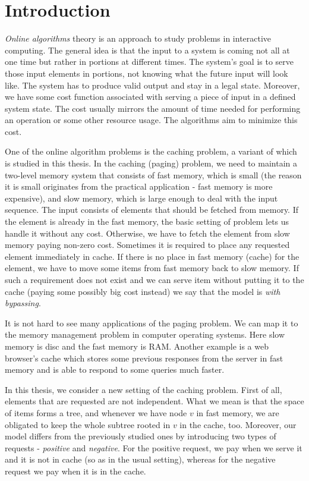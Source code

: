 \section{Introduction}
\textit{Online algorithms} theory is an approach to study problems in 
interactive computing. The general idea is that the input to a system is coming
not all at one time but rather in portions at different times. The system's 
goal is to serve those input elements in portions, not knowing what the 
future input will look like. The system has to produce valid output and stay in 
a legal state. Moreover, we have some cost function associated with serving a piece 
of input in a defined system state. The cost usually mirrors the amount of time 
needed for performing an operation or some other resource usage. The 
algorithms aim to minimize this cost.

One of the online algorithm problems is the caching problem, a variant of which is 
studied in this thesis. In the caching (paging) problem, we need to maintain a
two-level memory system that consists of fast memory, which is small (the reason 
it is small originates from the practical application - fast memory is more 
expensive), and slow memory, which is large enough to deal with the input 
sequence. The input consists of elements that should be fetched from memory. If 
the element is already in the fast memory, the basic setting of problem lets us 
handle it without any cost. Otherwise, we have to fetch the element from slow 
memory paying non-zero cost. Sometimes it is required to place any requested 
element immediately in cache. If there is no place in fast memory (cache) for 
the element, we have to move some items from fast memory back to slow memory. 
If such a requirement does not exist and we can serve item without putting it to 
the cache (paying some possibly big cost instead) we say that the model is 
\textit{with bypassing}.

It is not hard to see many applications of the paging problem. We can map it to 
the memory management problem in computer operating systems. Here slow memory 
is disc and the fast memory is RAM. Another example is a web browser's cache which 
stores some previous responses from the server in fast memory and is able to 
respond to some queries much faster.

In this thesis, we consider a new setting of the caching problem. First of all, 
elements that are requested are not independent. What we mean is that the 
space of items forms a tree, and whenever we have node $v$ in fast memory, we 
are obligated to keep the whole subtree rooted in $v$ in the cache, too. Moreover,
our model differs from the previously studied ones by introducing two types of 
requests - \textit{positive} and \textit{negative}. For the positive request, we 
pay when we serve it and it is not in cache (so as in the usual setting), whereas 
for the negative request we pay when it is in the cache.

